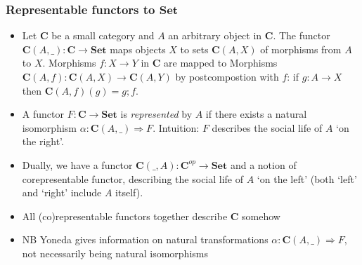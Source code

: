 \documentclass[handout]{beamer}
\newcommand{\To}{\Rightarrow}
\newcommand{\bfsf}[1]{{\boldsymbol{#1}}}
\newcommand{\Set}{\bfsf{Set}}
\newcommand{\CC}{\bfsf{C}}
\begin{document}
\frame
  {   
    \frametitle{Representable functors to $\Set$}\label{Yon:ReprFun}

 \begin{itemize}[<+->]
\item Let $\CC$ be a small category and $A$ an arbitrary object in $\CC$. 
The functor  $\CC(A,\_):\CC\to\Set$ maps objects $X$ to sets $\CC(A,X)$
of morphisms from $A$ to $X$. Morphisms $f: X\to Y$ in $\CC$ are
mapped to Morphisms $\CC(A,f): \CC(A,X)\to\CC(A,Y)$ by
postcompostion with $f$: if $g:A\to X$ then $\CC(A,f)(g) = g;f$.
\item A functor $F:\CC\to\Set$ is \emph{represented} by $A$ if
there exists a natural isomorphism $\alpha: \CC(A,\_)\To F$.
Intuition: $F$ describes the social life of $A$ `on the right'.
\item Dually, we have a functor $\CC(\_,A):\CC^{op}\to\Set$
and a notion of corepresentable functor, 
describing the social life of $A$ `on the left' 
(both `left' and `right' include $A$ itself).
\item All (co)representable functors together describe $\CC$ somehow
\item NB Yoneda gives information on natural transformations 
$\alpha: \CC(A,\_)\To F$, not necessarily being natural isomorphisms

\end{itemize}

 }
\end{document}
